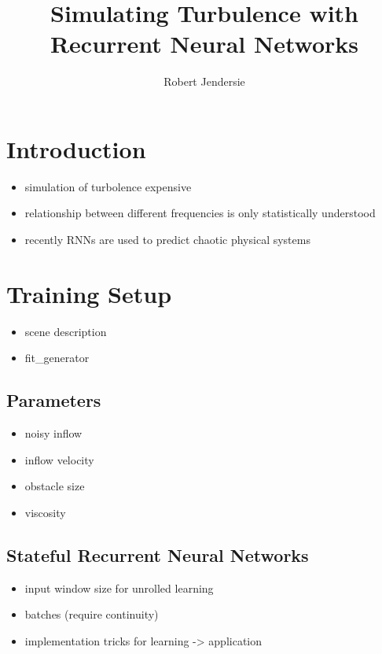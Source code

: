 \documentclass[sigconf]{acmart}
\begin{document}
\title{Simulating Turbulence with Recurrent Neural Networks }
\subtitle{}

\author{Robert Jendersie}

\maketitle

\section{Introduction}
\begin{itemize}
	\item simulation of turbolence expensive
	\item relationship between different frequencies is only statistically understood \cite{kim2008wavelet}
	\item recently RNNs are used to predict chaotic physical systems \cite{vlachas2019forecasting}
\end{itemize}
\section{Training Setup}
\begin{itemize}
	\item scene description
	\item fit\_generator
\end{itemize}
\subsection{Parameters}
\begin{itemize}
	\item noisy inflow
	\item inflow velocity
	\item obstacle size
	\item viscosity
\end{itemize}
\subsection{Stateful Recurrent Neural Networks}
\begin{itemize}
	\item input window size for unrolled learning
	\item batches (require continuity)
	\item implementation tricks for learning -> application
\end{itemize}
\end{document}
